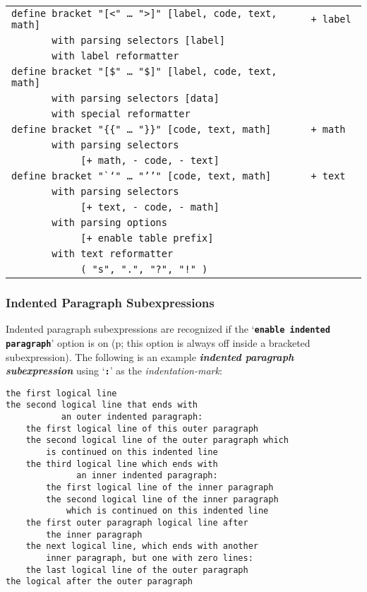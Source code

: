 \documentclass[12pt]{article}
\newcommand{\TT}[1]{{\tt \bfseries #1}}
\newcommand{\key}[1]{{\bf \em #1}\index{#1}}
\newcommand{\pagref}[1]{p\pageref{#1}}
\newenvironment{indpar}[1][0.3in]%
	{\begin{list}{}%
		     {\setlength{\itemsep}{0in}%
		      \setlength{\topsep}{0in}%
		      \setlength{\parsep}{1ex}%
		      \setlength{\labelwidth}{#1}%
		      \setlength{\leftmargin}{#1}%
		      \addtolength{\leftmargin}{\labelsep}}%
	 \item}%
	{\end{list}}
\begin{document}
\begin{center}
\begin{tabular}{l@{\hspace*{0.2in}}l}
\tt define bracket "[<" \ldots~">]" [label, code, text, math] & \tt + label \\
\tt ~~~~~~~with parsing selectors [label] \\
\tt ~~~~~~~with label reformatter \\
\tt define bracket "[\$" \ldots~"\$]" [label, code, text, math] \\
\tt ~~~~~~~with parsing selectors [data] \\
\tt ~~~~~~~with special reformatter \\
\tt define bracket "\{\{" \ldots~"\}\}" [code, text, math]   & \tt + math \\
\tt ~~~~~~~with parsing selectors \\
\tt ~~~~~~~~~~~~[+ math, - code, - text] \\
\tt define bracket "`{}`" \ldots~"'{}'" [code, text, math]   & \tt + text \\
\tt ~~~~~~~with parsing selectors \\
\tt ~~~~~~~~~~~~[+ text, - code, - math] \\
\tt ~~~~~~~with parsing options \\
\tt ~~~~~~~~~~~~[+ enable table prefix] \\
\tt ~~~~~~~with text reformatter \\
\tt ~~~~~~~~~~~~( "s", ".", "?", "!" ) \\
\end{tabular}
\end{center}

\subsubsection{Indented Paragraph Subexpressions}
\label{INDENTED-PARAGRAPH-SUBEXPRESSIONS}

Indented paragraph subexpressions
are recognized if the `\TT{enable indented paragraph}'
option is on (\pagref{ENABLE-INDENTED-PARAGRAPH}; this
option is always off inside a bracketed subexpression).
The following is an example
\key{indented paragraph subexpression}
using `\TT{:}' as the {\em indentation-mark}:
\begin{indpar}\begin{verbatim}
the first logical line
the second logical line that ends with
           an outer indented paragraph:
    the first logical line of this outer paragraph
    the second logical line of the outer paragraph which
        is continued on this indented line
    the third logical line which ends with
              an inner indented paragraph:
        the first logical line of the inner paragraph
        the second logical line of the inner paragraph
            which is continued on this indented line
    the first outer paragraph logical line after
        the inner paragraph
    the next logical line, which ends with another
        inner paragraph, but one with zero lines:
    the last logical line of the outer paragraph
the logical after the outer paragraph
\end{verbatim}\end{indpar}
\end{document}
